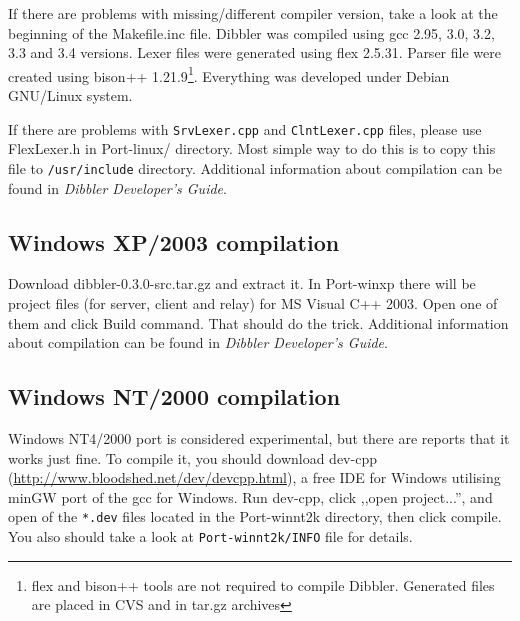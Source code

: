 If there are problems with missing/different compiler
version, take a look at the beginning of the Makefile.inc
file. Dibbler was compiled using gcc 2.95, 3.0, 3.2, 3.3 and 3.4
versions. Lexer files were generated using flex 2.5.31. Parser file
were created using bison++ 1.21.9\footnote{flex and bison++ tools are
  not required to compile Dibbler. Generated files are placed in CVS
  and in tar.gz archives}. Everything was developed under Debian
GNU/Linux system.

If there are problems with \verb+SrvLexer.cpp+ and
\verb+ClntLexer.cpp+ files, please use FlexLexer.h in Port-linux/
directory. Most simple way to do this is to copy this file to
\verb+/usr/include+ directory. Additional information about
compilation can be found in \emph{Dibbler Developer's Guide}.

\subsection{Windows XP/2003 compilation}
Download dibbler-0.3.0-src.tar.gz and extract it. In Port-winxp there
will be project files (for server, client and relay) for MS
Visual C++ 2003. Open one of them and click Build command. That should
do the trick. Additional information about compilation can be found in
\emph{Dibbler Developer's Guide}.

\subsection{Windows NT/2000 compilation}
Windows NT4/2000 port is considered experimental, but there are reports
that it works just fine. To compile it, you should download dev-cpp
(\url{http://www.bloodshed.net/dev/devcpp.html}), a free IDE for
Windows utilising minGW port of the gcc for Windows. Run dev-cpp,
click ,,open project...'', and open of the \verb+*.dev+ files located
in the Port-winnt2k directory, then click compile. You also should
take a look at \verb+Port-winnt2k/INFO+ file for details.
